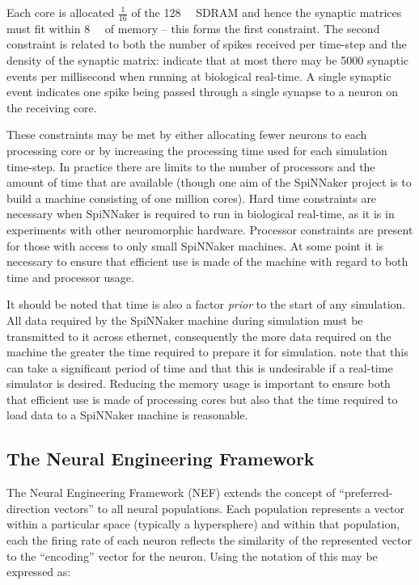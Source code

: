 \documentclass[conference]{IEEEtran}
\begin{document}
Each core is allocated $\frac{1}{16}$ of the \SI{128}{\mebi\byte} SDRAM and hence the synaptic matrices must fit within \SI{8}{\mebi\byte} of memory -- this forms the first constraint.
The second constraint is related to both the number of spikes received per time-step and the density of the synaptic matrix: \textcite[\S III.C]{Sharp2013} indicate that at most there may be \num{5000} synaptic events per millisecond when running at biological real-time.
A single synaptic event indicates one spike being passed through a single synapse to a neuron on the receiving core.

These constraints may be met by either allocating fewer neurons to each processing core or by increasing the processing time used for each simulation time-step.
In practice there are limits to the number of processors and the amount of time that are available (though one aim of the SpiNNaker project is to build a machine consisting of one million cores).
Hard time constraints are necessary when SpiNNaker is required to run in biological real-time, as it is in experiments with other neuromorphic hardware.
Processor constraints are present for those with access to only small SpiNNaker machines.
At some point it is necessary to ensure that efficient use is made of the machine with regard to both time and processor usage.

It should be noted that time is also a factor \textit{prior} to the start of any simulation.
All data required by the SpiNNaker machine during simulation must be transmitted to it across ethernet, consequently the more data required on the machine the greater the time required to prepare it for simulation.
\textcite{Sharp2013} note that this can take a significant period of time and that this is undesirable if a real-time simulator is desired.
Reducing the memory usage is important to ensure both that efficient use is made of processing cores but also that the time required to load data to a SpiNNaker machine is reasonable.

  \subsection{The Neural Engineering Framework}
  \label{sef:background/nef}

The Neural Engineering Framework (NEF) extends the concept of ``preferred-direction vectors'' \parencite{} to all neural populations.
Each population represents a vector within a particular space (typically a hypersphere) and within that population, each the firing rate of each neuron reflects the similarity of the represented vector to the ``encoding'' vector for the neuron.
Using the notation of \textcite{Stewart2014} this may be expressed as:
\end{document}
